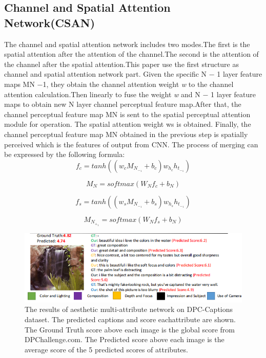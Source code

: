 \documentclass[xelatex,a4j,10pt,twocolumn]{article}
\begin{document}
\subsection{Channel and Spatial Attention Network(CSAN)}
The channel and spatial attention network \cite{12at}includes two modes.The first is the spatial attention after the attention of the channel.The second is the attention of the channel after the spatial attention.This paper use the first structure as channel and spatial attention network part. Given the specific N − 1 layer feature maps MN −1, they obtain the channel attention weight \textit{w} to the channel attention calculation.Then linearly to fuse the weight \textit{w} and N − 1 layer feature maps to obtain new N layer channel perceptual feature map.After that, the channel
perceptual feature map MN is sent to the spatial perceptual attention module for operation. The spatial attention weight ws is obtained. Finally, the channel perceptual feature map MN obtained
in the previous step is spatially perceived which is the features of output from CNN. The process of merging can be expressed by the following formula:
\begin{equation}
    f_c = tanh((w_cM_N_-_1+b_c)w_h_ch_t_-_1)
\end{equation}

\begin{equation}
M_N = softmax(W_Nf_c + b_N)
\end{equation}

\begin{equation}
    f_s = tanh((w_sM_N_-_1+b_s)w_h_sh_t_-_1)
\end{equation}

\begin{equation}
M_N_+_1 = softmax(W_Nf_s + b_N)
\end{equation}

\begin{figure}[t]
	\centering
    \includegraphics[width=1\textwidth]{11.png}    
 	\caption{The results of aesthetic multi-attribute network on DPC-Captions dataset. The predicted captions and score eachattribute are shown. The Ground Truth score above each image is the global score from DPChallenge.com. The Predicted score above each image is the average score of the 5 predicted scores of attributes.}
 	\label{fig:11}
\end{figure}
\end{document}

